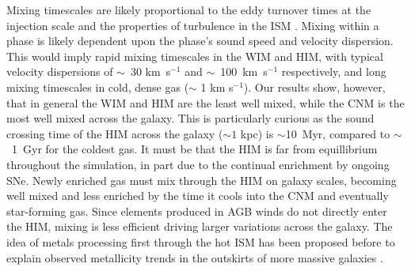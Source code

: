 \documentclass[twocolumn]{aastex61}
\begin{document}
%
%
%

%
%

Mixing timescales are likely proportional to the eddy turnover times at the injection scale \citep{PanScannapieco2010, Colbrook2017} and the properties of turbulence in the ISM \citep{YangKrumholz2012}. Mixing within a phase is likely dependent upon the phase's sound speed and velocity dispersion. This would imply rapid mixing timescales in the WIM and HIM, with typical velocity dispersions of $\sim$~30 km~s$^{-1}$ and $\sim$~100~km~s$^{-1}$ respectively, and long mixing timescales in cold, dense gas ($\sim$ 1 km s$^{-1}$). Our results show, however, that in general the WIM and HIM are the least well mixed, while the CNM is the most well mixed across the galaxy. This is particularly curious as the sound crossing time of the HIM across the galaxy ($\sim 1$ kpc) is $\sim$10~Myr, compared to $\sim$~1~Gyr for the coldest gas. It must be that the HIM is far from equillibrium throughout the simulation, in part due to the continual enrichment by ongoing SNe. Newly enriched gas must mix through the HIM on galaxy scales, becoming well mixed and less enriched by the time it cools into the CNM and eventually star-forming gas. Since elements produced in AGB winds do not directly enter the HIM, mixing is less efficient driving larger variations across the galaxy. The idea of metals processing first through the hot ISM has been proposed before to explain observed metallicity trends in the outskirts of more massive galaxies \citep{Tassis2008,Werk2011}.

\end{document}
